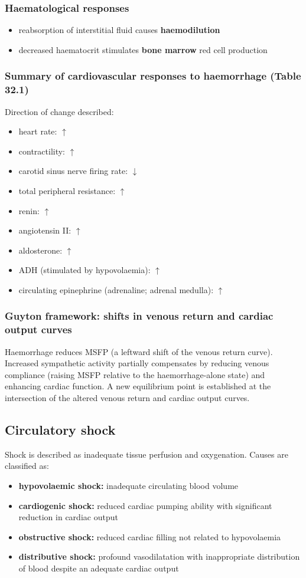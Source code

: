 \documentclass[11pt,a4paper]{article}
\begin{document}
\subsubsection{Haematological responses}
\begin{itemize}
\item reabsorption of interstitial fluid causes \textbf{haemodilution}
\item decreased haematocrit stimulates \textbf{bone marrow} red cell production
\end{itemize}

\subsubsection{Summary of cardiovascular responses to haemorrhage (Table 32.1)}
Direction of change described:
\begin{itemize}
\item heart rate: $\uparrow$
\item contractility: $\uparrow$
\item carotid sinus nerve firing rate: $\downarrow$
\item total peripheral resistance: $\uparrow$
\item renin: $\uparrow$
\item angiotensin II: $\uparrow$
\item aldosterone: $\uparrow$
\item ADH (stimulated by hypovolaemia): $\uparrow$
\item circulating epinephrine (adrenaline; adrenal medulla): $\uparrow$
\end{itemize}

\subsubsection{Guyton framework: shifts in venous return and cardiac output curves}
Haemorrhage reduces MSFP (a leftward shift of the venous return curve). Increased sympathetic activity partially compensates by reducing venous compliance (raising MSFP relative to the haemorrhage-alone state) and enhancing cardiac function. A new equilibrium point is established at the intersection of the altered venous return and cardiac output curves.

\subsection{Circulatory shock}
Shock is described as inadequate tissue perfusion and oxygenation. Causes are classified as:
\begin{itemize}
\item \textbf{hypovolaemic shock:} inadequate circulating blood volume
\item \textbf{cardiogenic shock:} reduced cardiac pumping ability with significant reduction in cardiac output
\item \textbf{obstructive shock:} reduced cardiac filling not related to hypovolaemia
\item \textbf{distributive shock:} profound vasodilatation with inappropriate distribution of blood despite an adequate cardiac output
\end{itemize}
\end{document}
